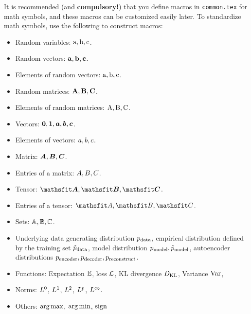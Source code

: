 It is recommended (and \textbf{compulsory!})
that you define macros
in \verb|common.tex|
for math symbols,
and these macros
can be customized easily later.
To standardize math symbols,
use the following to construct macros:
\begin{itemize}

    \item Random variables:
    \( {\textnormal{a}}, {\textnormal{b}}, {\textnormal{c}} \).

    \item Random vectors:
    \( {\mathbf{a}}, {\mathbf{b}}, {\mathbf{c}} \).

    \item Elements of random vectors:
    \( {\textnormal{a}}, {\textnormal{b}}, {\textnormal{c}} \).

    \item Random matrices:
    \( {\mathbf{A}}, {\mathbf{B}}, {\mathbf{C}} \).

    \item Elements of random matrices:
    \( {\textnormal{A}}, {\textnormal{B}}, {\textnormal{C}} \).

    \item Vectors:
    \( {\bm{0}}, {\bm{1}}, {\bm{a}}, {\bm{b}}, {\bm{c}} \).

    \item Elements of vectors:
    \( {a}, {b}, {c} \).

    \item Matrix:
    \( {\bm{A}}, {\bm{B}}, {\bm{C}} \).

    \item Entries of a matrix:
    \( {A}, {B}, {C} \).

    \item Tensor:
    \( \tA, \tB, \tC \).

    \item Entries of a tensor:
    \( \etA, \etB, \etC \).

    \item Sets:
    \( {\mathbb{A}}, {\mathbb{B}}, {\mathbb{C}} \).

    \item Underlying data generating distribution
    \( p_{\rm{data}} \),
    empirical distribution defined by the training set
    \( \hat{p}_{\rm{data}} \),
    model distribution \( p_{\rm{model}}, \tilde{p}_{\rm{model}} \),
    autoencoder distributions \( p_{\rm{encoder}}, p_{\rm{decoder}}, p_{\rm{reconstruct}} \).

    \item Functions:
    Expectation \( \mathbb{E} \),
    loss \( \mathcal{L} \),
    KL divergence \( D_{\mathrm{KL}} \),
    Variance \( \mathrm{Var} \),
    \etc{}

    \item Norms:
    \( L^0 \), \( L^1 \), \( L^2 \),
    \( L^p \), \( L^\infty \).

    \item Others:
    \( \operatorname*{arg\,max} \), \( \operatorname*{arg\,min} \), \( \operatorname{sign} \)

\end{itemize}

